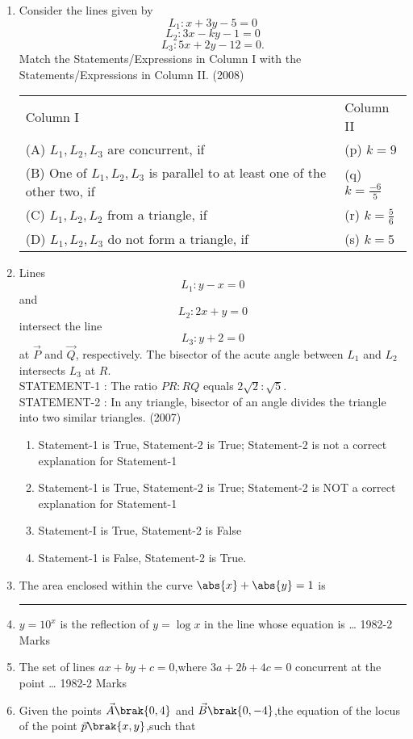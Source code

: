 	\begin{enumerate}
	\item Consider the lines given by
		$$L_1:x+3y-5=0$$ $$L_2:3x-ky-1=0$$ $$L_3:5x+2y-12=0.$$
		Match the Statements/Expressions in {Column I} with the Statements/Expressions in {Column II}. 
		\hfill(2008)
		\begin{tabular}{p{8cm} p{3cm}}
			Column I & Column II \\
			(A) $L_1,L_2,L_3$ are concurrent, if & (p) $k=9$ \\
			(B) One of $L_1,L_2,L_3$ is parallel to at least one of the other two, if & (q) $k=\frac{-6}{5}$ \\
			(C) $L_1,L_2,L_2$ from a triangle, if & (r) $k=\frac{5}{6}$ \\
			(D) $L_1,L_2,L_3$ do not form a triangle, if & (s) $k=5$
		\end{tabular}
\item Lines $$L_{1}: y-x=0$$ and $$L_{2}: 2x+y=0$$ intersect the line $$L_{3}: y+2=0$$ at $\vec{P}$ and $\vec{Q}$, respectively. The bisector of the acute 
angle between $L_{1}$ and $L_{2}$ intersects $L_{3}$ at $R$.\\
{STATEMENT-1 :} The ratio $PR:RQ$ equals $2\sqrt{2}:\sqrt{5}$.\\
{STATEMENT-2 :} In any triangle, bisector of an angle divides the triangle into two similar triangles.
\hfill{(2007)}
   \begin{enumerate}
   \item Statement-1 is True, Statement-2 is True; Statement-2 
is not a correct explanation for Statement-1 
   \item Statement-1 is True, Statement-2 is True; Statement-2 
is NOT a correct explanation for Statement-1 
   \item Statement-I is True, Statement-2 is False
   \item Statement-1 is False, Statement-2 is True. 
   \end{enumerate}
	\item The area enclosed within the curve $\abs{x}+\abs{y} =1$ is \rule{1cm}{0.01pt}
    \hfill {}
    \item $y = 10^x $ is the reflection of $y=\log x$ in the line whose equation is \dots
    \hfill{1982-2 Marks}
    \item The set of lines $ax+by+c=0$,where $3a+2b+4c=0$ concurrent at the point \dots
    \hfill{1982-2 Marks}
    \item Given the points $\vec{A}\brak{0,4}$ and $\vec{B}\brak{0,-4}$,the equation of the locus of the point $\vec{p}\brak{x,y}$,such that \\

\end{enumerate}
